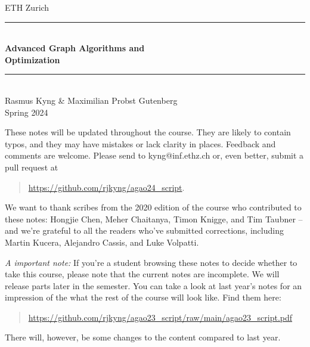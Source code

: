 \documentclass[12pt,a4paper,openany]{book}
\begin{document}
%
%
\begin{titlepage}

\newcommand{\HRule}{\rule{\linewidth}{0.5mm}} %
{\center

{\Large ETH Zurich}\\[1.5cm]
\HRule \\[0.4cm]
{ \huge \bfseries Advanced Graph Algorithms and \\ Optimization}\\[0.4cm] %
\HRule \\[1.5cm]

{\LARGE Rasmus Kyng \& Maximilian Probst Gutenberg}\\[2cm]


{\Large Spring 2024}\\[2cm] %

}
\vfill




\end{titlepage}

These notes will be updated throughout the course.
They are likely to contain typos, and they may have mistakes or
lack clarity in places. Feedback and comments are 
welcome. Please send to kyng@inf.ethz.ch or, even better, submit a pull request at
\begin{quote}
  \url{https://github.com/rjkyng/agao24_script}.
\end{quote}


We want to thank scribes from the 2020 edition of the course who
contributed to these notes: Hongjie
Chen, Meher Chaitanya, Timon Knigge, and Tim Taubner -- and we're
grateful to all the readers who've submitted corrections, including
Martin Kucera, Alejandro Cassis, and Luke Volpatti.

\emph{A important note:} If you're a student browsing these notes to
decide whether to take this course, please note that the current notes
are incomplete. We will release parts later in the
semester.
You can take a look at last year's notes for an impression of the
what the rest of the course will look like. Find them here:
\begin{quote}
  \url{https://github.com/rjkyng/agao23_script/raw/main/agao23_script.pdf}
\end{quote}
There will, however, be some changes to the content compared to last year.
\end{document}
